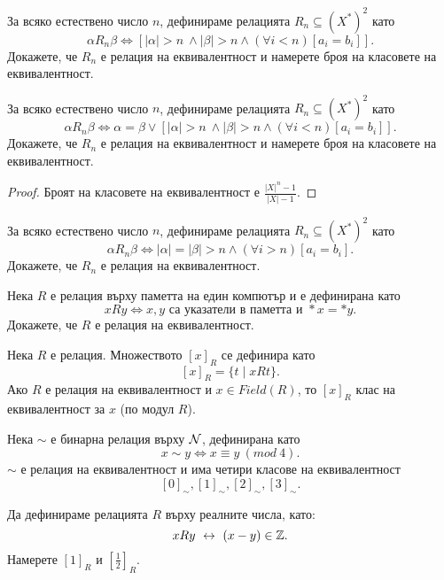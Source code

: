 \begin{problem}
  За всяко естествено число $n$, дефинираме релацията $R_n \subseteq (X^*)^2$ като
  \[\alpha R_n \beta \iff [|\alpha| > n\ \wedge |\beta| > n\wedge (\forall i < n)[a_i = b_i]].\]
  Докажете, че $R_n$ е релация на еквивалентност и намерете броя на класовете на еквивалентност.
\end{problem}

\begin{problem}
  За всяко естествено число $n$, дефинираме релацията $R_n \subseteq (X^*)^2$ като
  \[\alpha R_n \beta \iff \alpha = \beta \vee [|\alpha| > n\ \wedge |\beta| > n\wedge (\forall i < n)[a_i = b_i]].\]
  Докажете, че $R_n$ е релация на еквивалентност и намерете броя на класовете на еквивалентност.
\end{problem}
\begin{proof}
  Броят на класовете на еквивалентност е $\frac{|X|^n - 1}{|X| - 1}$.
\end{proof}


\begin{problem}
  За всяко естествено число $n$, дефинираме релацията $R_n \subseteq (X^*)^2$ като
  \[\alpha R_n \beta \iff |\alpha| = |\beta| > n\wedge (\forall i > n)[a_i = b_i].\]
  Докажете, че $R_n$ е релация на еквивалентност.
\end{problem}

\begin{problem}
  Нека $R$ е релация върху паметта на един компютър и е дефинирана като
  \[xRy \iff x,y\mbox{ са указатели в паметта и }*x = *y.\]
  Докажете, че $R$ е релация на еквивалентност.
\end{problem}



\begin{dfn}
  Нека $R$ е релация.
  Множеството $[x]_R$ се дефинира като
  \[[x]_R = \{t\mid xRt\}.\]
  Ако $R$ е релация на еквивалентност и $x\in Field(R)$, то $[x]_R$ клас на еквивалентност за $x$ (по модул $R$).
\end{dfn}

\begin{example}
  Нека $\sim$ е бинарна релация върху $\mathcal{N}$, дефинирана като
  \[x\sim y \iff x\equiv y\ (mod\ 4).\]
  $\sim$ е релация на еквивалентност и има четири класове на еквивалентност
  \[[0]_\sim, [1]_\sim, [2]_\sim, [3]_\sim.\]
\end{example}

\begin{problem}
  Да дефинираме релацията $R$ върху реалните числа, като:
  \[xRy \ \leftrightarrow\  (x-y)\in\mathbb{Z}.\]
  Намерете $[1]_R$ и $[\frac{1}{2}]_R$.
\end{problem}


